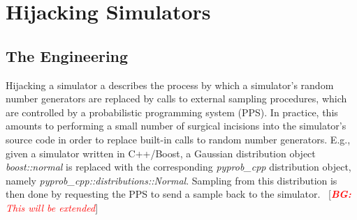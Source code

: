 \documentclass{article}
\newcommand{\bg}[1]{~{{[{\it \textcolor{red}{{\bf BG:} #1}}]}}}
\begin{document}


\section{Hijacking Simulators}
\label{sec:methods}


\subsection{The Engineering}
Hijacking a simulator a describes the process by which a simulator's random number generators are replaced by calls to external sampling procedures, which are controlled by a probabilistic programming system (PPS). In practice, this amounts to performing a small number of surgical incisions into the simulator's source code in order to replace built-in calls to random number generators. E.g., given a simulator written in C++/Boost\cite{schaling2011boost}, a Gaussian distribution object \textit{boost::normal} is replaced with the corresponding \textit{pyprob\_cpp} distribution object, namely \textit{pyprob\_cpp::distributions::Normal}. Sampling from this distribution is then done by requesting the PPS to send a sample back to the simulator. \bg{This will be extended}


 \label{sec:methods}
\end{document}
